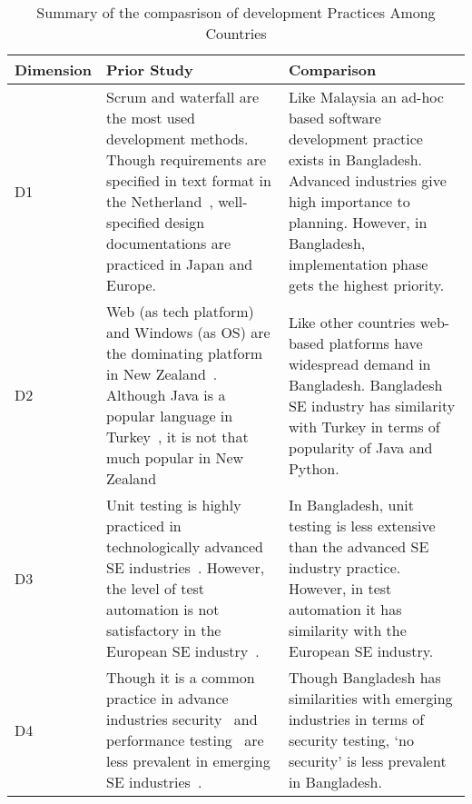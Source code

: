 
\begin{table}[!ht]
    \centering
    \caption{Summary of the compasrison of development Practices Among Countries}
    \label{table:comparison_summary}
    \begin{tabularx}{\textwidth}{v|m|m}
    \hline
    \textbf{Dimension}& \textbf{Prior Study}& \textbf{Comparison}\\ \hline
    D1 & Scrum and waterfall \citep{Wang2018,Garousi2015} are the most used development methods. Though requirements are specified in text format in the Netherland~\citep{Vonken2012}, well-specified design documentations are practiced in Japan and Europe\citep{Cusumano2003}. & Like Malaysia an ad-hoc based software development practice exists in Bangladesh. Advanced industries give high importance to planning. However, in Bangladesh, implementation phase gets the highest priority. \\ \hline
    
    
    D2 & Web (as tech platform) and Windows (as OS) are the dominating platform in New Zealand~\citep{Wang2018}. Although Java is a popular language in Turkey~\citep{Garousi2015}, it is not that much popular in New Zealand~\citep{Wang2018} &  Like other countries web-based platforms have widespread demand in Bangladesh. Bangladesh SE industry has similarity with Turkey in terms of popularity of Java and Python. \\ \hline
    
    
    D3 & Unit testing is highly practiced in technologically advanced SE industries~\citep{Garousi2013, Wang2018}. However, the level of test automation is not satisfactory in the European SE industry~\citep{dutta1999}. & In Bangladesh, unit testing is less extensive than the advanced SE industry practice. However, in test automation it has similarity with the European SE industry.\\ \hline
    
    D4 & Though it is a common practice in advance industries security~\citep{Garousi2015, Farvin2016, Bahl2011, Sung2006} and performance testing~\citep{Garousi2013,Garousi2015,Phillips2003} are less prevalent in emerging SE industries~\citep{Jahan2019}. &  Though Bangladesh has similarities with emerging industries in terms of security testing, `no security' is less prevalent in Bangladesh.\\ \hline


    \end{tabularx}
\end{table}

